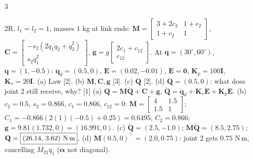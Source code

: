 \begin{multicols}{3}
\begin{examq}
\end{examq}
\begin{examq}
2R, $l_1=l_2=1$, masses $1$ kg at link ends: $\mathbf M=\begin{bmatrix}3+2c_2&1+c_2\\1+c_2&1\end{bmatrix}$, $\mathbf C=\begin{bmatrix}-s_2(2\dot q_1\dot q_2+\dot q_2^2)\\s_2\dot q_1^2\end{bmatrix}$, $\mathbf g=g\begin{bmatrix}2c_1+c_{12}\\c_{12}\end{bmatrix}$. At $\mathbf q=(30^\circ,60^\circ)$, $\dot{\mathbf q}=(1,-0.5)$: $\ddot{\mathbf q}_d=(0.5,0)$, $\mathbf E=(0.02,-0.01)$, $\dot{\mathbf E}=\mathbf 0$, $\mathbf K_p=100\mathbf I$, $\mathbf K_v=20\mathbf I$. (a) Law [2]. (b) $\mathbf M,\mathbf C,\mathbf g$ [3]. (c) $\mathbf Q$ [2]. (d) $\acute{\mathbf Q}=(0.5,0)$: what does joint 2 still receive, why? [1]
\solution
(a) $\mathbf Q=\mathbf M\acute{\mathbf Q}+\mathbf C+\mathbf g$, $\acute{\mathbf Q}=\ddot{\mathbf q}_d+\mathbf K_v\dot{\mathbf E}+\mathbf K_p\mathbf E$.
(b) $c_2=0.5$, $s_2=0.866$, $c_1=0.866$, $c_{12}=0$: $\mathbf M=\begin{bmatrix}4&1.5\\1.5&1\end{bmatrix}$; $C_1=-0.866(2(1)(-0.5)+0.25)=0.6495$, $C_2=0.866$; $\mathbf g=9.81(1.732,0)=(16.991,0)$.
(c) $\acute{\mathbf Q}=(2.5,-1.0)$; $\mathbf M\acute{\mathbf Q}=(8.5,2.75)$; $\mathbf Q=\boxed{(26.14,\,3.62)\text{ N\,m}}$.
(d) $\mathbf M(0.5,0)^\top=(2.0,0.75)$: joint 2 gets $0.75$ N\,m, cancelling $M_{21}\ddot q_1$ ($\boldsymbol\alpha$ not diagonal). \chk
\end{examq}
\end{multicols}
